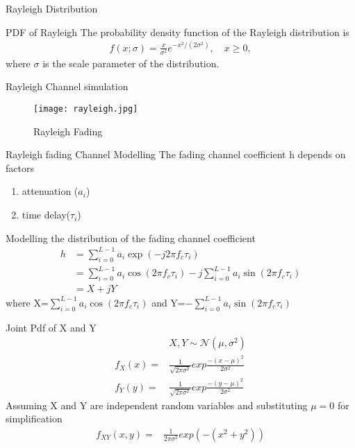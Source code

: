 \documentclass{beamer}
\begin{document}
\begin{frame}{Rayleigh Distribution}
\begin{block}{PDF of Rayleigh}
 The probability density function of the Rayleigh distribution is
\begin{align}
    { f(x;\sigma )={\frac {x}{\sigma ^{2}}}e^{-x^{2}/(2\sigma ^{2})},\quad x\geq 0,}  
\end{align}
where  $\sigma$ is the scale parameter of the distribution.
\end{block}

\end{frame}
\begin{frame}{Rayleigh Channel simulation}
    \begin{figure}
    \centering
    \texttt{[image: rayleigh.jpg]}
    \caption{Rayleigh Fading}
    \label{4}
\end{figure}   
\end{frame}
\begin{frame}{Rayleigh fading Channel Modelling}
The fading channel coefficient h depends on factors 
\begin{enumerate}
    \item attenuation ($a_i$)
    \item time delay($\tau_i$)
\end{enumerate}
\begin{block}{Modelling the distribution of the fading channel coefficient}
\begin{align}
    h&=\sum_{i=0}^{L-1}a_i\exp{(-j2\pi f_c \tau_i)}\\
    &=\sum_{i=0}^{L-1}a_i\cos{(2\pi f_c \tau_i)}-j\sum_{i=0}^{L-1}a_i\sin{(2\pi f_c \tau_i)}\\
    &=X+jY
\end{align}
where X=$\sum_{i=0}^{L-1}a_i\cos{(2\pi f_c \tau_i)}$ and Y=$-\sum_{i=0}^{L-1}a_i\sin{(2\pi f_c \tau_i)}$
\end{block}
\end{frame}
\begin{frame}{}
\begin{block}{Joint Pdf of X and Y}
\begin{align}
&X,Y\sim \mathcal{N}(\mu ,\sigma^2)\\
f_X(x)=&\frac{1}{\sqrt{2\pi \sigma^2}}exp{\frac{-(x-\mu)^2}{2\sigma^2}}\\
f_Y(y)=&\frac{1}{\sqrt{2\pi \sigma^2}}exp{\frac{-(y-\mu)^2}{2\sigma^2}}
\end{align}
Assuming X and Y are independent random variables and substituting $\mu=0$ for simplification 
\begin{align}
f_{XY}(x,y)=&\frac{1}{{2\pi \sigma^2 }}exp{\left(-(x^2+y^2)\right)}  \label{eq1} 
\end{align}
\end{block}
\end{frame}
\end{document}
